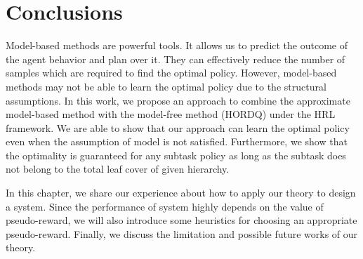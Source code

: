 \chapter{Conclusions}


Model-based methods are powerful tools. It allows us to predict the outcome 
of the agent behavior and plan over it. They can effectively reduce the number of 
samples which are required to find the optimal policy.
However, model-based methods may not be able to learn the optimal
policy due to the structural assumptions.
In this work, we propose an approach to combine the approximate model-based method with the
model-free method (HORDQ) under the HRL framework. We are able to show that our approach
can learn the optimal policy even when the assumption of model is not satisfied. Furthermore, we show that the optimality
is guaranteed for any subtask policy as long as the subtask does not belong to the total leaf
cover of given hierarchy.

In this chapter, we share our experience about how to apply our theory to design a system.
Since the performance of system highly depends on the value of pseudo-reward, we will also introduce
some heuristics for choosing an appropriate pseudo-reward.
Finally, we discuss the limitation and possible future works of our theory. 


